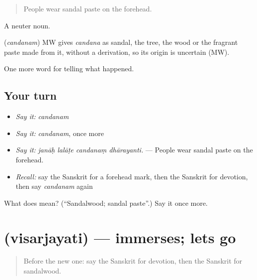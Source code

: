 \begin{quote}
People wear sandal paste on the forehead.
\end{quote}

A neuter noun.

\begin{cousinweb}
\textbf{} (\emph{candanam}) MW gives \emph{candana} as sandal, the tree, the wood or the fragrant paste made from it, without a derivation, so its origin is uncertain (MW).
\end{cousinweb}

\begin{grammarlens}[title={What you've built}]
One more word for telling what happened.
\end{grammarlens}

\subsection*{Your turn}
\begin{itemize}
\raggedright
  \item \emph{Say it:} \emph{candanam}
  \item \emph{Say it:} \emph{candanam}, once more
  \item \emph{Say it:} \emph{janāḥ lalāṭe candanaṃ dhārayanti.} — People wear sandal paste on the forehead.
  \item \emph{Recall:} say the Sanskrit for a forehead mark, then the Sanskrit for devotion, then say \emph{candanam} again
\end{itemize}

\begin{tcolorbox}[breakable,colback=teal!4,colframe=teal!35!black,title={Before you move on}]
What does  mean? (\textquotedblleft{}Sandalwood; sandal paste\textquotedblright{}.) Say it once more.
\end{tcolorbox}
\section[\texorpdfstring{\sk{विसर्जयति} (visarjayati)}{विसर्जयति (visarjayati)}]{ (visarjayati) — immerses; lets go}

\label{lesson:SA-C331-visarjayati}



\begin{quote}
Before the new one: say the Sanskrit for devotion, then the Sanskrit for sandalwood.
\end{quote}

